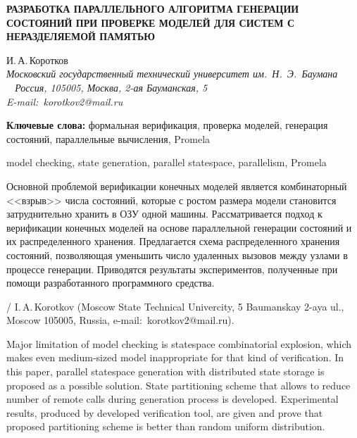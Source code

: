 \documentclass[12pt,a4paper,fleqn]{article}
\begin{document}
\begin{center}{ \fontsize{18pt}{23pt}\selectfont\bf РАЗРАБОТКА ПАРАЛЛЕЛЬНОГО АЛГОРИТМА ГЕНЕРАЦИИ СОСТОЯНИЙ ПРИ ПРОВЕРКЕ
    МОДЕЛЕЙ ДЛЯ СИСТЕМ С НЕРАЗДЕЛЯЕМОЙ ПАМЯТЬЮ}
\end{center}

\vspace{5mm}

\begin{center}
И.\,А.\,Коротков\\
\footnotesize\it Московский государственный технический университет им.~Н.~Э.~Баумана\\\
\rm
Россия, 105005, Москва, 2-ая Бауманская, 5\\
E-mail:~korotkov2@mail.ru

\hspace{1.25cm}

\vspace{8mm}

\begin{minipage}{12.16cm}\noindent

\footnotesize{\bf Ключевые слова:} формальная верификация, проверка моделей, генерация состояний, параллельные
вычисления, Promela

 model checking, state generation, parallel statespace, parallelism, Promela

\vspace{6mm}

\noindent Основной проблемой верификации конечных моделей является комбинаторный <<взрыв>> числа состояний, которые с
ростом размера модели становится затруднительно хранить в ОЗУ одной машины. Рассматривается подход к верификации
конечных моделей на основе параллельной генерации состояний и их распределенного хранения. Предлагается схема
распределенного хранения состояний, позволяющая уменьшить число удаленных вызовов между узлами в процессе
генерации. Приводятся результаты экспериментов, полученные при помощи разработанного программного средства.

\vspace{4mm}

 /
I.\,A.\,Korotkov (Moscow State Technical Univercity, 5 Baumanskay 2-aya ul., Moscow 105005, Russia,
e-mail:~korotkov2@mail.ru).

Major limitation of model checking is statespace combinatorial explosion, which makes even medium-sized model
inappropriate for that kind of verification. In this paper, parallel statespace generation with distributed state
storage is proposed as a possible solution. State partitioning scheme that allows to reduce number of remote calls
during generation process is developed.  Experimental results, produced by developed verification tool, are given and
prove that proposed partitioning scheme is better than random uniform distribution.
\end{minipage}

\end{center}
\end{document}
